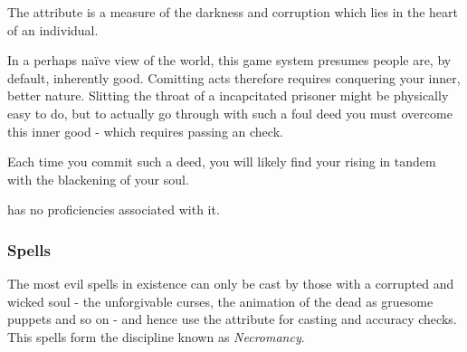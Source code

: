 The \attEvl{} attribute is a measure of the darkness and corruption which lies in the heart of an individual. 

In a perhaps na{\"i}ve view of the world, this game system presumes people are, by default, inherently good. Comitting \attEvl{} acts therefore requires conquering your inner, better nature. Slitting the throat of a incapcitated prisoner might be physically easy to do, but to actually go through with such a foul deed you must overcome this inner good - which requires passing an \attEvl{} check. 

Each time you commit such a deed, you will likely find your \attEvl{} rising in tandem with the blackening of your soul. 

\attEvl{} has no proficiencies associated with it. 

\subsubsection{Spells}

The most evil spells in existence can only be cast by those with a corrupted and wicked soul - the unforgivable curses, the animation of the dead as gruesome puppets and so on - and hence use the \attEvl{} attribute for casting and accuracy checks. This spells form the discipline known as {\it Necromancy}. 
